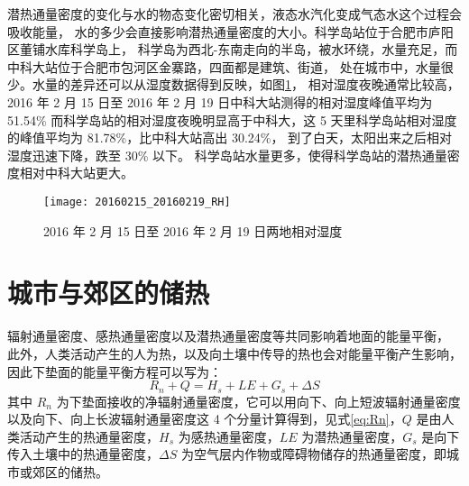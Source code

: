 潜热通量密度的变化与水的物态变化密切相关，液态水汽化变成气态水这个过程会吸收能量，
水的多少会直接影响潜热通量密度的大小。科学岛站位于合肥市庐阳区董铺水库科学岛上，
科学岛为西北-东南走向的半岛，被水环绕，水量充足，而中科大站位于合肥市包河区金寨路，四面都是建筑、街道，
处在城市中，水量很少。水量的差异还可以从湿度数据得到反映，如图\ref{fig:20160215_20160219_RH}，
相对湿度夜晚通常比较高，2016 年 2 月 15 日至 2016 年 2 月 19 日中科大站测得的相对湿度峰值平均为 51.54\%
而科学岛站的相对湿度夜晚明显高于中科大，这 5 天里科学岛站相对湿度的峰值平均为 81.78\%，比中科大站高出 30.24\%，
到了白天，太阳出来之后相对湿度迅速下降，跌至 30\% 以下。
科学岛站水量更多，使得科学岛站的潜热通量密度相对中科大站更大。
\begin{figure}[H]
\centering
\texttt{[image: 20160215\_20160219\_RH]}
\caption{2016 年 2 月 15 日至 2016 年 2 月 19 日两地相对湿度}\label{fig:20160215_20160219_RH}
\end{figure}

\section{城市与郊区的储热}
辐射通量密度、感热通量密度以及潜热通量密度等共同影响着地面的能量平衡，
此外，人类活动产生的人为热，以及向土壤中传导的热也会对能量平衡产生影响，因此下垫面的能量平衡方程可以写为：
\begin{equation}\label{eq:balance}
  R_n + Q = H_s + LE + G_s + \Delta S
\end{equation}
其中 \(R_n\) 为下垫面接收的净辐射通量密度，它可以用向下、向上短波辐射通量密度以及向下、向上长波辐射通量密度这 4 个分量计算得到，见式\ref{eq:Rn}，\(Q\) 是由人类活动产生的热通量密度，\(H_s\) 为感热通量密度，\(LE\) 为潜热通量密度，\(G_s\) 是向下传入土壤中的热通量密度，\(\Delta S\) 为空气层内作物或障碍物储存的热通量密度，即城市或郊区的储热。

